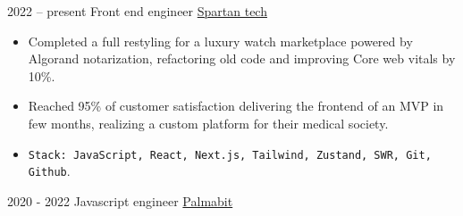 \documentclass[9pt]{developercv} %
\begin{document}
\vspace{-10 pt}
\begin{entrylist}
	\entry
        {2022 -- present}
		{Front end engineer}
		{\href{https://www.spartantech.it/}{Spartan tech}}
		{\vspace{-10pt}
        \begin{itemize}[noitemsep,topsep=0pt,parsep=0pt,partopsep=0pt, leftmargin=-1pt]
            \item Completed a full restyling for a luxury watch marketplace powered by Algorand notarization, refactoring old code and improving Core web vitals by 10\%.
            \item Reached 95\% of customer satisfaction delivering the frontend of an MVP in few months, realizing a custom platform for their medical society.
            
            \item  \texttt{Stack: JavaScript, React, Next.js, Tailwind, Zustand, SWR, Git, 
        Github}.
        \end{itemize} }
	\entry
		{2020 - 2022}
		{Javascript engineer}
		{\href{https://www.palmabit.com/}{Palmabit}}
		{\vspace{-10pt}
        \begin{itemize}[noitemsep,topsep=0pt,parsep=0pt,partopsep=0pt, leftmargin=-1pt]


\end{itemize}}
\end{entrylist}
\end{document}

